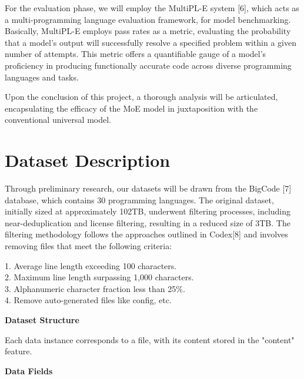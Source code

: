 \documentclass{article}
\begin{document}
	For the evaluation phase, we will employ the MultiPL-E system [6], which acts
	as a multi-programming language evaluation framework, for model benchmarking.
	Basically, MultiPL-E employs pass rates as a metric, evaluating the
	probability that a model's output will successfully resolve a specified
	problem within a given number of attempts. This metric offers a quantifiable gauge
	of a model's proficiency in producing functionally accurate code across diverse
	programming languages and tasks.

	Upon the conclusion of this project, a thorough analysis will be articulated, encapsulating
	the efficacy of the MoE model in juxtaposition with the conventional universal
	model.

	\section{Dataset Description}
  
	Through preliminary research, our datasets will be drawn from the BigCode [7]
	database, which contains 30 programming languages. The original dataset, initially
	sized at approximately 102TB, underwent filtering processes, including near-deduplication
	and license filtering, resulting in a reduced size of 3TB. The filtering methodology
	follows the approaches outlined in Codex[8] and involves removing files that
	meet the following criteria:

	1. Average line length exceeding 100 characters.\\ 2. Maximum line length
	surpassing 1,000 characters.\\ 3. Alphanumeric character fraction less than 25$\%$.\\
	4. Remove auto-generated files like config, etc.

	\textbf{Dataset Structure}

	Each data instance corresponds to a file, with its content stored in the "content"
	feature.

	\textbf{Data Fields}
\end{document}
